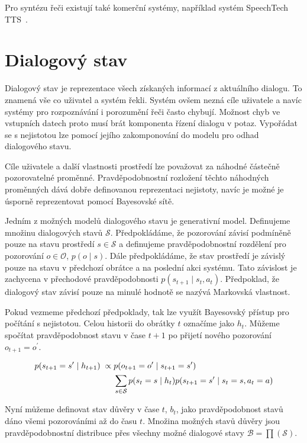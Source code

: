 Pro syntézu řeči existují také komerční systémy, například systém SpeechTech TTS~\cite{speechtech}.

\section{Dialogový stav}

Dialogový stav je reprezentace všech získaných informací z aktuálního dialogu.
To znamená vše co uživatel a systém řekli.
Systém ovšem nezná cíle uživatele a navíc systémy pro rozpoznávání i porozumění řeči často chybují.
Možnost chyb ve vstupních datech proto musí brát komponenta řízení dialogu v potaz.
Vypořádat se s nejistotou lze pomocí jejího zakomponování do modelu pro odhad dialogového stavu.

Cíle uživatele a další vlastnosti prostředí lze považovat za náhodné částečně pozorovatelné proměnné.
Pravděpodobnostní rozložení těchto náhodných proměnných dává dobře definovanou reprezentaci nejistoty, navíc je možné je úsporně reprezentovat pomocí Bayesovské sítě.

Jedním z možných modelů dialogového stavu je generativní model.
Definujeme množinu dialogových stavů $\mathcal{S}$.
Předpokládáme, že pozorování závisí podmíněně pouze na stavu prostředí $s \in \mathcal{S}$ a definujeme pravděpodobnostní rozdělení pro pozorování $o \in \mathcal{O}$, $p(o \mid s)$.
Dále předpokládáme, že stav prostředí je závislý pouze na stavu v předchozí obrátce a na poslední akci systému.
Tato závislost je zachycena v přechodové pravděpodobnosti $p(s_{t+1} \mid s_t, a_t)$.
Předpoklad, že dialogový stav závisí pouze na minulé hodnotě se nazývá Markovská vlastnost.

Pokud vezmeme předchozí předpoklady, tak lze využít Bayesovský přístup pro počítání s nejistotou.
Celou historii do obrátky $t$ označíme jako $h_t$.
Můžeme spočítat pravděpodobnost stavu v čase $t+1$ po přijetí nového pozorování $o_{t+1} = o^\prime$.

\begin{align}
\small
p(s_{t+1} = s^\prime \mid h_{t+1}) \; \propto \;& 
    p(o_{t+1} = o^\prime \mid s_{t+1} = s^\prime) \\
    &\sum_{s \in \mathcal{S}}
        p(s_t = s \mid h_t)
        p(s_{t+1} = s^\prime \mid s_t = s, a_t = a) \nonumber
\label{eq:beliefupdate}
\end{align}

Nyní můžeme definovat stav důvěry v čase $t$, $b_t$, jako pravděpodobnost stavů dáno všemi pozorováními až do času $t$.
Množina možných stavů důvěry jsou pravděpodobnostní distribuce přes všechny možné dialogové stavy $\mathcal{B} = \prod(\mathcal{S})$.

